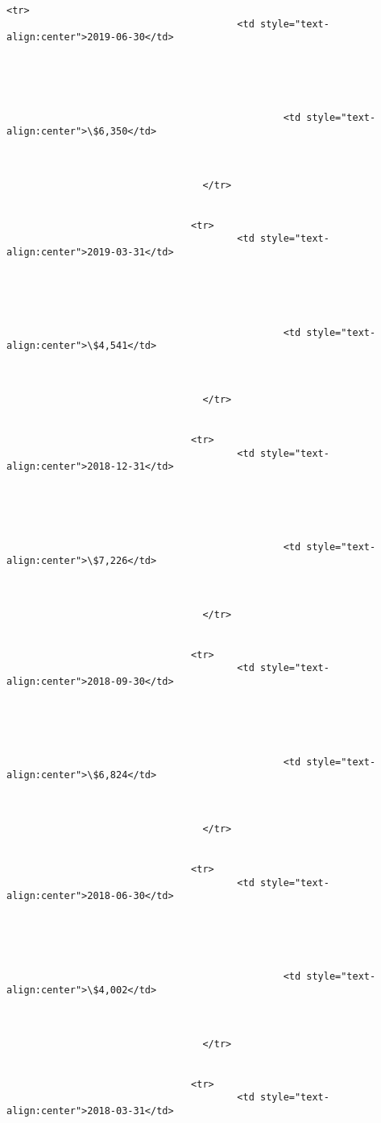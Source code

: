 \documentclass[11pt]{article}
\begin{document}
\begin{Verbatim}[commandchars=\\\{\}]
                                <tr>
                                        <td style="text-
align:center">2019-06-30</td>





                                                <td style="text-
align:center">\$6,350</td>



                                  </tr>


                                <tr>
                                        <td style="text-
align:center">2019-03-31</td>





                                                <td style="text-
align:center">\$4,541</td>



                                  </tr>


                                <tr>
                                        <td style="text-
align:center">2018-12-31</td>





                                                <td style="text-
align:center">\$7,226</td>



                                  </tr>


                                <tr>
                                        <td style="text-
align:center">2018-09-30</td>





                                                <td style="text-
align:center">\$6,824</td>



                                  </tr>


                                <tr>
                                        <td style="text-
align:center">2018-06-30</td>





                                                <td style="text-
align:center">\$4,002</td>



                                  </tr>


                                <tr>
                                        <td style="text-
align:center">2018-03-31</td>






\end{Verbatim}
\end{document}
